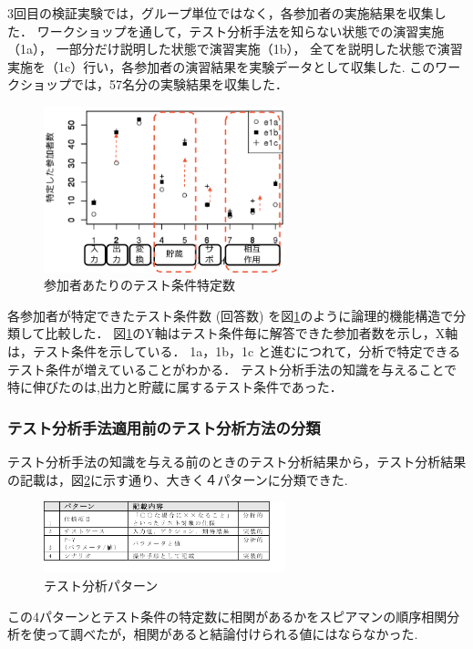 \documentclass[10pt,a4j]{jarticle}
\begin{document}
3回目の検証実験では，グループ単位ではなく，各参加者の実施結果を収集した．
ワークショップを通して，テスト分析手法を知らない状態での演習実施（1a），
一部分だけ説明した状態で演習実施（1b），
全てを説明した状態で演習実施を（1c）行い，各参加者の演習結果を実験データとして収集した.
このワークショップでは，57名分の実験結果を収集した．

\begin{figure}[h]
  \begin{center}
  \includegraphics[width=7cm]{./image/D-3-Fig12-1.png}
  \caption{参加者あたりのテスト条件特定数}
  \label{fig:D-3-Fig12-1}
  \end{center}
\end{figure}

各参加者が特定できたテスト条件数 (回答数) を図\ref{fig:D-3-Fig12-1}のように論理的機能構造で分類して比較した．
図\ref{fig:D-3-Fig12-1}のY軸はテスト条件毎に解答できた参加者数を示し，X軸は，テスト条件を示している．
1a，1b，1c と進むにつれて，分析で特定できるテスト条件が増えていることがわかる．
テスト分析手法の知識を与えることで特に伸びたのは,出力と貯蔵に属するテスト条件であった．

\subsubsection{テスト分析手法適用前のテスト分析方法の分類}
テスト分析手法の知識を与える前のときのテスト分析結果から，テスト分析結果の記載は，図\ref{fig:D-3-Fig14}に示す通り、大きく４パターンに分類できた.
\begin{figure}[h]
  \begin{center}
  \includegraphics[width=7cm]{./image/D-3-Fig14.png}
  \caption{テスト分析パターン}
  \label{fig:D-3-Fig14}
  \end{center}
\end{figure}
この4パターンとテスト条件の特定数に相関があるかをスピアマンの順序相関分析を使って調べたが，相関があると結論付けられる値にはならなかった.
\end{document}

